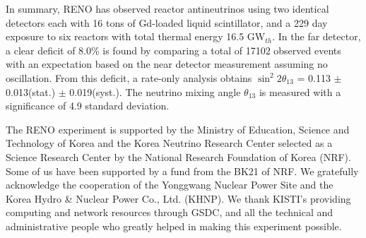 \documentclass[aps,prl,twocolumn,superscriptaddress,showpacs]{revtex4-1}
\begin{document}
In summary, RENO has observed reactor antineutrinos using two identical detectors each with 16 tons of Gd-loaded liquid scintillator, and a 229 day exposure to six reactors with total thermal energy 16.5 GW$_{th}$. In the far detector, a clear deficit of 8.0\% is found by comparing a total of 17102 observed events with an expectation based on the near detector measurement assuming no oscillation. From this deficit, a rate-only analysis obtains $\sin^2 2 \theta_{13}$ = 0.113 $\pm$ 0.013(stat.) $\pm$ 0.019(syst.). The neutrino mixing angle $\theta_{13}$ is measured with a significance of 4.9 standard deviation.

The RENO experiment is supported by the Ministry of Education, Science and Technology of Korea and the Korea Neutrino Research Center selected as a Science Research Center by the National Research Foundation of Korea (NRF). Some of us have been supported by a fund from the BK21 of NRF.
We gratefully acknowledge the cooperation of the Yonggwang Nuclear Power Site and the Korea Hydro \& Nuclear Power Co., Ltd. (KHNP). 
We thank KISTI's providing computing and network resources through GSDC, and all the technical and administrative people who greatly helped in making this experiment possible.
\end{document}
